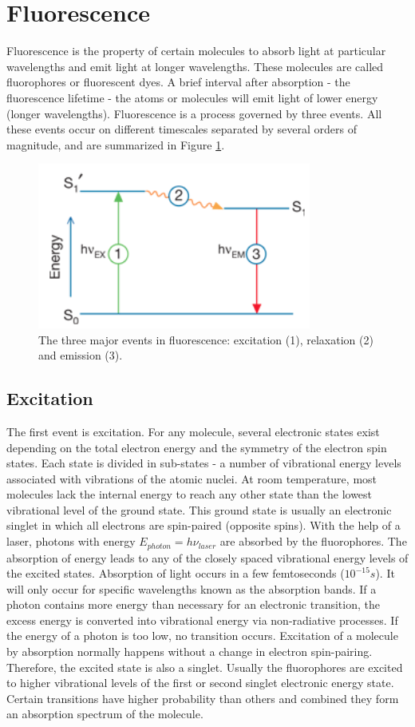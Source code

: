 \documentclass[twoside,single]{lion-msc}
\begin{document}
\section{Fluorescence}
Fluorescence is the property of certain molecules to absorb light at particular wavelengths and emit light at longer wavelengths. These molecules are called fluorophores or fluorescent dyes. A brief interval after absorption - the fluorescence lifetime - the atoms or molecules will emit light of lower energy (longer wavelengths).  Fluorescence is a process governed by three events. All these events occur on different timescales separated by several orders of magnitude, and are summarized in Figure \ref{fluor}.
\begin{figure}[ht!]
\centering
\includegraphics[width=90mm]{fluorescence.jpg}
\caption{The three major events in fluorescence: excitation (1), relaxation (2) and emission (3).} 
\label{fluor}
\end{figure}

\subsection{Excitation}
The first event is excitation. For any molecule, several electronic states exist depending on the total electron energy and the symmetry of the electron spin states. Each state is divided in sub-states - a number of vibrational energy levels associated with vibrations of the atomic nuclei. At room temperature, most molecules lack the internal energy to reach any other state than the lowest vibrational level of the ground state. This ground state is usually an electronic singlet in which all electrons are spin-paired (opposite spins). With the help of a laser, photons with energy $E_{photon}=h \nu_{laser}$ are absorbed by the fluorophores. The absorption of energy leads to any of the closely spaced vibrational energy levels of the excited states. Absorption of light occurs in a few femtoseconds ($10^{-15}s$). It will only occur for specific wavelengths known as the absorption bands. If a photon contains more energy than necessary for an electronic transition, the excess energy is converted into vibrational energy via non-radiative processes. If the energy of a photon is too low, no transition occurs. Excitation of a molecule by absorption normally happens without a change in electron spin-pairing. Therefore, the excited state is also a singlet. Usually the fluorophores are excited to higher vibrational levels of the first or second singlet electronic energy state. Certain transitions have higher probability than others and combined they form an absorption spectrum of the molecule.
\end{document}

